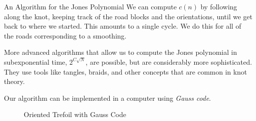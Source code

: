 \documentclass{beamer}
\begin{document}
    \begin{frame}{An Algorithm for the Jones Polynomial}
        We can compute $c(n)$ by following along the knot, keeping track of
        the road blocks and the orientations, until we get back to where we
        started. This amounts to a single cycle. We do this for all of the
        roads corresponding to a smoothing.
        \par\hfill\par
        More advanced algorithms that allow us to compute the Jones polynomial
        in subexponential time, $2^{C\sqrt{N}}$, are possible, but are
        considerably more sophisticated. They use tools like tangles, braids,
        and other concepts that are common in knot theory.
    \end{frame}
    \begin{frame}
        Our algorithm can be implemented in a computer using
        \textit{Gauss code}.
        \begin{figure}
            \centering
            \caption{Oriented Trefoil with Gauss Code}
        \end{figure}
    \end{frame}
\end{document}
